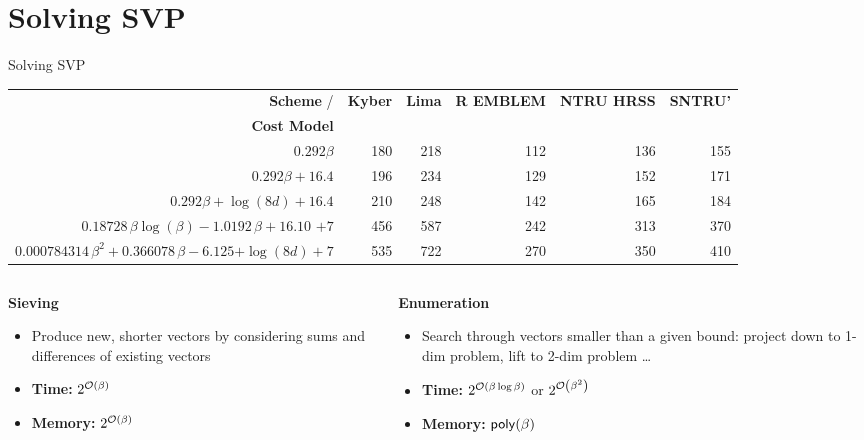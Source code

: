 \documentclass[xcolor=table,10pt,aspectratio=169]{beamer}
\def\enumquadfit{\(0.000784314\, \beta^2 + 0.366078\,\beta - 6.125\)}
\def\enumlinfit{\(0.18728\, \beta \log(\beta) - 1.0192\,\beta + 16.10\)}
\def\robl{\rowcolor{DarkBlue!20}}
\def\rore{\rowcolor{DarkRed!20}}
\begin{document}
\section{Solving SVP}
\label{sec:orgc904ac4}
\begin{frame}[label={sec:orgc6f5b46}]{Solving SVP}
\begin{scriptsize}
\begin{center}
\begin{tabular}{rrrrrr}
\textbf{Scheme}      / & \textbf{Kyber} & \textbf{Lima} & \textbf{R EMBLEM} & \textbf{NTRU HRSS} & \textbf{SNTRU’}\\
\textbf{Cost Model} &  &  &  &  & \\
\hline
\rore  \(0.292\beta\) & 180 & 218 & 112 & 136 & 155\\
\rore \(0.292\beta + 16.4\) & 196 & 234 & 129 & 152 & 171\\
\rore \(0.292\beta + \log(8d) + 16.4\) & 210 & 248 & 142 & 165 & 184\\
\robl \enumlinfit{} \(+ 7\) & 456 & 587 & 242 & 313 & 370\\
\robl  \enumquadfit \(+ \log(8d) + 7\) & 535 & 722 & 270 & 350 & 410\\
\end{tabular}

\end{center}
\end{scriptsize}


\begin{columns}[t]
\begin{column}{0.5\columnwidth}
{\color{LightRed} \textbf{Sieving} }


\begin{itemize}
\item Produce new, shorter vectors by considering sums and differences of existing vectors
\item \textbf{Time:} \(2^{\mathcal{O}\left(\beta\right)}\)
\item \textbf{Memory:} \(2^{\mathcal{O}\left(\beta\right)}\)
\end{itemize}
\end{column}

\begin{column}{0.5\columnwidth}
{\color{DarkBlue} \textbf{Enumeration} }

\begin{itemize}
\item Search through vectors smaller than a given bound: project down to 1-dim problem, lift to 2-dim problem …
\item \textbf{Time:} \(2^{\mathcal{O}\left(\beta \log \beta\right)}\) or \(2^{\mathcal{O}\left(\beta^2\right)}\)
\item \textbf{Memory:} \(\poly[\beta]\)
\end{itemize}
\end{column}
\end{columns}
\end{frame}
\end{document}
